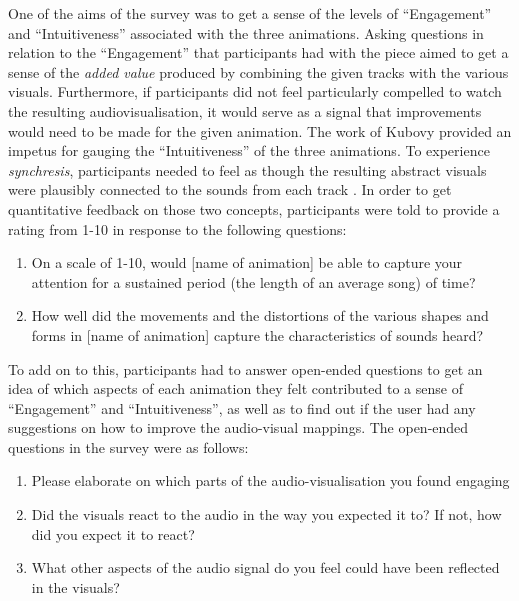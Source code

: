 \documentclass[../initial_thesis.tex]{subfiles}
\begin{document}


One of the aims of the survey was to get a sense of the levels of ``Engagement'' and ``Intuitiveness'' associated with the three animations. Asking questions in relation to the ``Engagement'' that participants had with the piece aimed to get a sense of the \emph{added value} produced by combining the given tracks with the various visuals. Furthermore, if participants did not feel particularly compelled to watch the resulting audiovisualisation, it would serve as a signal that improvements would need to be made for the given animation. The work of Kubovy provided an impetus for gauging the ``Intuitiveness'' of the three animations. To experience \emph{synchresis}, participants needed to feel as though the resulting abstract visuals were plausibly connected to the sounds from each track \cite{Kubovy2010}. In order to get quantitative feedback on those two concepts, participants were told to provide a rating from 1-10 in response to the following questions:

\begin{enumerate}
\item {On a scale of 1-10, would [name of animation] be able to capture your attention for a sustained period (the length of an average song) of time?}
\item {How well did the movements and the distortions of the various shapes and forms in [name of animation] capture the characteristics of sounds heard?}
\end{enumerate}

To add on to this, participants had to answer open-ended questions to get an idea of which aspects of each animation they felt contributed to a sense of ``Engagement'' and ``Intuitiveness'', as well as to find out if the user had any suggestions on how to improve the audio-visual mappings. The open-ended questions in the survey were as follows:

\begin{enumerate}
\item {Please elaborate on which parts of the audio-visualisation you found engaging}
\item {Did the visuals react to the audio in the way you expected it to? If not, how did you expect it to react?}
\item {What other aspects of the audio signal do you feel could have been reflected in the visuals?}
\end{enumerate}
\end{document}
